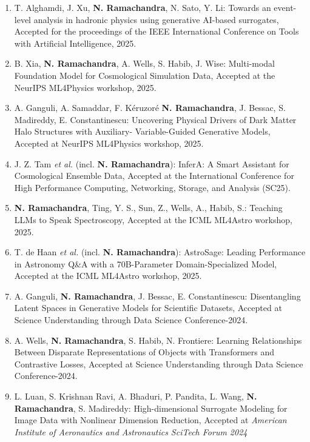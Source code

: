\documentclass[letterpaper]{article}
\begin{document}
\begin{enumerate}


\item T. Alghamdi, J. Xu, \textbf{N. Ramachandra}, N. Sato, Y. Li: Towards an event-level analysis in hadronic physics using generative AI-based surrogates, Accepted for the proceedings of the IEEE International
Conference on Tools with Artificial Intelligence, 2025. 

\item B. Xia, \textbf{N. Ramachandra}, A. Wells, S. Habib, J. Wise: Multi-modal Foundation Model for Cosmological
Simulation Data, Accepted at the NeurIPS ML4Physics workshop, 2025. 


\item A. Ganguli, A. Samaddar, F. K\'eruzor\'e \textbf{N. Ramachandra}, J. Bessac, S. Madireddy, E. Constantinescu: Uncovering Physical Drivers of Dark Matter Halo Structures with Auxiliary- Variable-Guided Generative Models, Accepted at NeurIPS ML4Physics workshop, 2025. 

\item J. Z. Tam {\it et al.} (incl. \textbf{N. Ramachandra}): InferA: A Smart Assistant for Cosmological Ensemble Data, Accepted at the International Conference for High Performance Computing, Networking, Storage, and Analysis (SC25). 


\item \textbf{N. Ramachandra}, Ting, Y. S., Sun, Z., Wells, A., Habib, S.: Teaching LLMs to Speak Spectroscopy, Accepted at the ICML ML4Astro workshop, 2025. 


\item T. de Haan {\it et al.} (incl. \textbf{N. Ramachandra}): AstroSage: Leading Performance in Astronomy Q\&A with a 70B-Parameter Domain-Specialized
Model, Accepted at the ICML ML4Astro workshop, 2025.


\item A. Ganguli, \textbf{N. Ramachandra}, J. Bessac, E. Constantinescu: Disentangling Latent Spaces in Generative Models for Scientific Datasets, Accepted at Science Understanding through Data Science Conference-2024.


\item A. Wells, \textbf{N. Ramachandra}, S. Habib,  N. Frontiere: Learning Relationships Between Disparate Representations of Objects with Transformers and Contrastive Losses, Accepted at Science Understanding through Data Science Conference-2024.

\item L. Luan, S. Krishnan Ravi, A. Bhaduri, P. Pandita, L. Wang, \textbf{N. Ramachandra}, S. Madireddy: High-dimensional Surrogate Modeling for Image Data with Nonlinear Dimension Reduction, Accepted at {\it American Institute of Aeronautics and Astronautics SciTech Forum 2024}


\end{enumerate}
\end{document}
